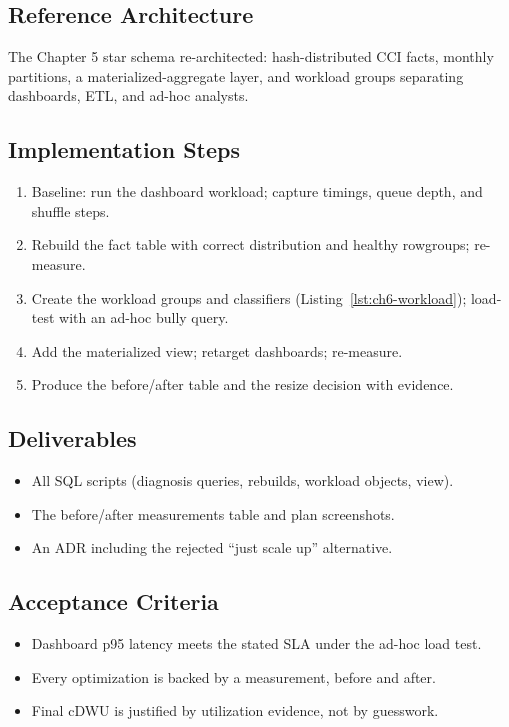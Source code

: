 \subsection*{Reference Architecture}
The Chapter 5 star schema re-architected: hash-distributed CCI facts, monthly partitions, a materialized-aggregate layer, and workload groups separating dashboards, ETL, and ad-hoc analysts.

\subsection*{Implementation Steps}
\begin{enumerate}
    \item Baseline: run the dashboard workload; capture timings, queue depth, and shuffle steps.
    \item Rebuild the fact table with correct distribution and healthy rowgroups; re-measure.
    \item Create the workload groups and classifiers (Listing~\ref{lst:ch6-workload}); load-test with an ad-hoc bully query.
    \item Add the materialized view; retarget dashboards; re-measure.
    \item Produce the before/after table and the resize decision with evidence.
\end{enumerate}

\subsection*{Deliverables}
\begin{itemize}
    \item All SQL scripts (diagnosis queries, rebuilds, workload objects, view).
    \item The before/after measurements table and plan screenshots.
    \item An ADR including the rejected ``just scale up'' alternative.
\end{itemize}

\subsection*{Acceptance Criteria}
\begin{itemize}
    \item Dashboard p95 latency meets the stated SLA under the ad-hoc load test.
    \item Every optimization is backed by a measurement, before and after.
    \item Final cDWU is justified by utilization evidence, not by guesswork.
\end{itemize}


